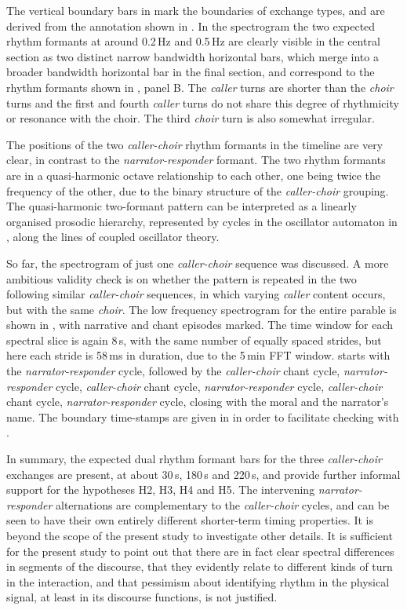 \documentclass[output=paper,colorlinks,citecolor=brown]{langscibook}
\begin{document}
The vertical boundary bars in  mark the boundaries of exchange types, and are derived from the annotation shown in . In the spectrogram the two expected rhythm formants at around 0.2\,Hz and 0.5\,Hz are clearly visible in the central section as two distinct narrow bandwidth horizontal bars, which merge into a broader bandwidth horizontal bar in the final section, and correspond to the rhythm formants shown in , panel B. The \textit{caller} turns are shorter than the \textit{choir} turns and the first and fourth \textit{caller} turns do not share this degree of rhythmicity or resonance with the choir. The third \textit{choir} turn is also somewhat irregular.

The positions of the two \textit{caller-choir} rhythm formants in the timeline are very clear, in contrast to the \textit{narrator-responder} formant. The two rhythm formants are in a quasi-harmonic octave relationship to each other, one being twice the frequency of the other, due to the binary structure of the \textit{caller-choir} grouping. The quasi-harmonic two-formant pattern can be interpreted as a linearly organised prosodic hierarchy, represented by cycles in the oscillator automaton in , along the lines of coupled oscillator theory.

So far, the spectrogram of just one \textit{caller-choir} sequence was discussed. A more ambitious validity check is on whether the pattern is repeated in the two following similar \textit{caller-choir} sequences, in which varying \textit{caller} content occurs, but with the same \textit{choir}. The low frequency spectrogram for the entire parable is shown in , with narrative and chant episodes marked. The time window for each spectral slice is again 8\,s, with the same number of equally spaced strides, but here each stride is 58\,ms in duration, due to the 5\,min FFT window.  starts with the \textit{narrator-responder} cycle, followed by the \textit{caller-choir} chant cycle, \textit{narrator-responder} cycle, \textit{caller-choir} chant cycle, \textit{narrator-responder} cycle, \textit{caller-choir} chant cycle, \textit{narrator-responder} cycle, closing with the moral and the narrator's name. The boundary time-stamps are given in  in order to facilitate checking with .

In summary, the expected dual rhythm formant bars for the three \textit{caller-choir} exchanges are present, at about 30\,s, 180\,s and 220\,s, and provide further informal support for the hypotheses H2, H3, H4 and H5. The intervening \textit{narrator-responder} alternations are complementary to the \textit{caller-choir} cycles, and can be seen to have their own entirely different shorter-term timing properties. It is beyond the scope of the present study to investigate other details. It is sufficient for the present study to point out that there are in fact clear spectral differences in segments of the discourse, that they evidently relate to different kinds of turn in the interaction, and that pessimism about identifying rhythm in the physical signal, at least in its discourse functions, is not justified.
\end{document}
